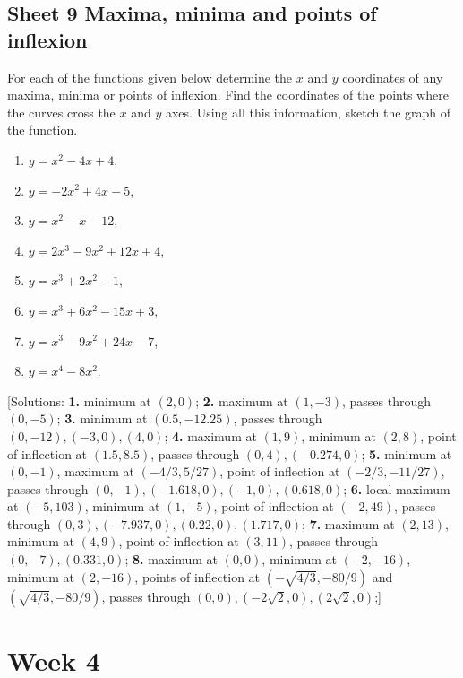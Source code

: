 \documentclass[
  11pt,
  oneside]{book}
\providecommand{\tightlist}{%
  \setlength{\itemsep}{0pt}\setlength{\parskip}{0pt}}
\newcommand{\slide}{}
\theoremstyle{definition}
\theoremstyle{definition}
\theoremstyle{definition}
\theoremstyle{definition}
\theoremstyle{remark}
\begin{document}
\slide

\section{Sheet 9 Maxima, minima and points of inflexion}\label{sheet-9-maxima-minima-and-points-of-inflexion}

For each of the functions given below determine the \(x\) and \(y\) coordinates of any maxima, minima or points of inflexion. Find the coordinates of the points where the curves cross the \(x\) and \(y\) axes. Using all this information, sketch the graph of the function.

\begin{enumerate}
\def\labelenumi{\arabic{enumi}.}
\tightlist
\item
  \(y=x^2-4x+4\),
\item
  \(y=-2x^2+4x-5\),
\item
  \(y=x^2-x-12\),
\item
  \(y=2x^3-9x^2+12x+4\),
\item
  \(y=x^3+2x^2-1\),
\item
  \(y=x^3+6x^2-15x+3\),
\item
  \(y=x^3-9x^2+24x-7\),
\item
  \(y=x^4-8x^2\).
\end{enumerate}

{[}Solutions:
\textbf{1.} minimum at \((2,0)\);
\textbf{2.} maximum at \((1,-3)\), passes through \((0,-5)\);
\textbf{3.} minimum at \((0.5,-12.25)\), passes through \((0,-12), (-3,0), (4,0)\);
\textbf{4.} maximum at \((1,9)\), minimum at \((2,8)\), point of inflection at \((1.5,8.5)\), passes through \((0,4), (-0.274,0)\);
\textbf{5.} minimum at \((0,-1)\), maximum at \((-4/3,5/27)\), point of inflection at \((-2/3,-11/27)\), passes through \((0,-1), (-1.618,0), (-1,0), (0.618,0)\);
\textbf{6.} local maximum at \((-5,103)\), minimum at \((1,-5)\), point of inflection at \((-2,49)\), passes through \((0,3), (-7.937,0), (0.22,0), (1.717,0)\);
\textbf{7.} maximum at \((2,13)\), minimum at \((4,9)\), point of inflection at \((3,11)\), passes through \((0,-7), (0.331,0)\);
\textbf{8.} maximum at \((0,0)\), minimum at \((-2,-16)\), minimum at \((2,-16)\), points of inflection at \((-\sqrt{4/3},-80/9)\) and \((\sqrt{4/3},-80/9)\), passes through \((0,0), (-2\sqrt{2},0), (2\sqrt{2},0)\);{]}

\chapter{Week 4}\label{week-four}
\end{document}

